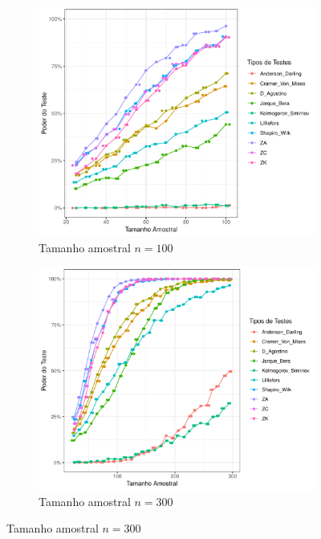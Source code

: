 \documentclass[a4paper,11pt]{article} %
\begin{document}
\begin{figure}[H]
    \vspace{0.5cm} %
    \begin{subfigure}[b]{0.45\textwidth}
        \centering
        \includegraphics[width=\textwidth]{Distribuição Beta/Poder do Teste/poder_teste_beta_100.pdf}
        \caption{Tamanho amostral \(n = 100\)}
        \label{fig:beta_poder_100}
    \end{subfigure}
    \hfill
    \begin{subfigure}[b]{0.45\textwidth}
        \centering
        \includegraphics[width=\textwidth]{Distribuição Beta/Poder do Teste/poder_teste_beta_300.pdf}
        \caption{Tamanho amostral \(n = 300\)}
        \label{fig:beta_poder_300}
    \end{subfigure}
    

\end{figure}
\end{document}
